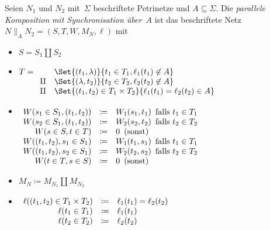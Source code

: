 \documentclass{cheat-sheet}
\newcommand{\parallelComposition}{\parallel} %
\begin{document}
\begin{defn}
  Seien $N_1$ und $N_2$ mit~$\Sigma$ beschriftete Petrinetze und $A \subseteq \Sigma$.
  Die \emph{parallele Komposition} \textit{mit Synchronisation über~$A$} ist das beschriftete Netz $N \parallelComposition_A N_2 = (S, T, W, M_N, \ell)$ mit
  \begin{itemize}
    \item $S = S_1 \amalg S_2$
    \item
      $
        T =
        \begin{array}[t]{r l}
          & \Set{(t_1, \lambda)}{t_1 \in T_1, \ell_1(t_1) \not\in A} \\
          \amalg & \Set{(\lambda, t_2)}{t_2 \in T_2, \ell_2(t_2) \not\in A} \\
          \amalg & \Set{(t_1, t_2) \in T_1 \times T_2}{\ell_1(t_1) = \ell_2(t_2) \in A}
        \end{array}
      $
      \item
        $
          \begin{array}[t]{r c l}
            W(s_1 \in S_1, (t_1, t_2)) &\coloneqq& W_1(s_1, t_1) \enspace \text{falls $t_1 \in T_1$} \\
            W(s_2 \in S_1, (t_1, t_2)) &\coloneqq& W_2(s_2, t_2) \enspace \text{falls $t_2 \in T_2$} \\
            W(s \in S, t \in T) &\coloneqq& 0 \enspace \text{(sonst)} \\
            W((t_1, t_2), s_1 \in S_1) &\coloneqq& W_1(t_1, s_1) \enspace \text{falls $t_1 \in T_1$} \\
            W((t_1, t_2), s_2 \in S_1) &\coloneqq& W_2(t_2, s_2) \enspace \text{falls $t_2 \in T_2$} \\
            W(t \in T, s \in S) &\coloneqq& 0 \enspace \text{(sonst)}
          \end{array}
        $
        \item $M_N \coloneqq M_{N_1} \amalg M_{N_2}$
        \item
          $
            \begin{array}[t]{r c l}
              \ell((t_1, t_2) \in T_1 \times T_2) &\coloneqq& \ell_1(t_1) = \ell_2(t_2) \\
              \ell(t_1 \in T_1) &\coloneqq& \ell_1(t_1) \\
              \ell(t_2 \in T_2) &\coloneqq& \ell_2(t_2) \\
            \end{array}
          $
  \end{itemize}
\end{defn}
\end{document}
